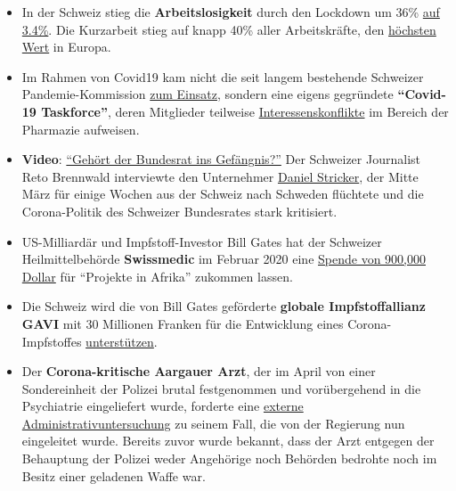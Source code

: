 \begin{itemize}
{  der Schweizer} eine \textbf{stärkere Überwachung} durch
  ``Corona-Apps'' befürchten. Dennoch plane eine Mehrheit, die App zur
  Kontaktverfolgung zu nutzen.
\item
  In der Schweiz stieg die \textbf{Arbeitslosigkeit} durch den Lockdown
  um 36\%
  \href{https://www.nzz.ch/wirtschaft/im-herbst-koennte-es-zu-einer-entlassungswelle-in-der-schweiz-kommen-ld.1560235}{auf
  3.4\%}. Die Kurzarbeit stieg auf knapp 40\% aller Arbeitskräfte, den
  \href{https://industriemagazin.at/a/kurzarbeit-in-europa-nur-schweiz-hat-hoeheren-anteil-als-oesterreich}{höchsten
  Wert} in Europa.
\item
  Im Rahmen von Covid19 kam nicht die seit langem bestehende Schweizer
  Pandemie-Kommission
  \href{https://www.srf.ch/news/schweiz/bag-verzichtete-auf-beratung-was-macht-die-pandemie-kommission-in-der-krise}{zum
  Einsatz}, sondern eine eigens gegründete \textbf{``Covid-19
  Taskforce''}, deren Mitglieder teilweise
  \href{https://ncs-tf.ch/de/organisation}{Interessenskonflikte} im
  Bereich der Pharmazie aufweisen.
\item
  \textbf{Video}:
  \href{https://www.youtube.com/watch?v=RyZGkdeQ6CY}{``Gehört der
  Bundesrat ins Gefängnis?''} Der Schweizer Journalist Reto Brennwald
  interviewte den Unternehmer
  \href{https://www.youtube.com/user/timturpis/videos}{Daniel Stricker},
  der Mitte März für einige Wochen aus der Schweiz nach Schweden
  flüchtete und die Corona-Politik des Schweizer Bundesrates stark
  kritisiert.
\item
  US-Milliardär und Impfstoff-Investor Bill Gates hat der Schweizer
  Heilmittelbehörde \textbf{Swissmedic} im Februar 2020 eine
  \href{https://www.christoph-pfluger.ch/2020/05/23/der-groesste-impfstoff-investor-schenkt-der-swissmedic-900000-dollar/}{Spende
  von 900,000 Dollar} für ``Projekte in Afrika'' zukommen lassen.
\item
  Die Schweiz wird die von Bill Gates geförderte \textbf{globale
  Impfstoffallianz GAVI} mit 30 Millionen Franken für die Entwicklung
  eines Corona-Impfstoffes
  \href{https://www.aargauerzeitung.ch/panorama/schweiz-unterstuetzt-impfallianz-gavi-mit-30-millionen-138082583}{unterstützen}.
\item
  Der \textbf{Corona-kritische Aargauer Arzt}, der im April von einer
  Sondereinheit der Polizei brutal festgenommen und vorübergehend in die
  Psychiatrie eingeliefert wurde, forderte eine
  \href{https://www.aargauerzeitung.ch/aargau/kanton-aargau/polizeieinsatz-wegen-wettinger-arzt-regierung-beschliesst-externe-administrativuntersuchung-137913013}{externe
  Administrativuntersuchung} zu seinem Fall, die von der Regierung nun
  eingeleitet wurde. Bereits zuvor wurde bekannt, dass der Arzt entgegen
  der Behauptung der Polizei weder Angehörige noch Behörden bedrohte
  noch im Besitz einer geladenen Waffe war.
\end{itemize}

